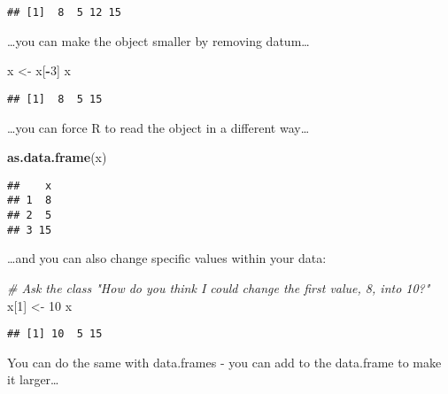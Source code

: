 \documentclass[]{article}
\newenvironment{Shaded}{\begin{snugshade}}{\end{snugshade}}
\newcommand{\KeywordTok}[1]{\textcolor[rgb]{0.13,0.29,0.53}{\textbf{#1}}}
\newcommand{\DecValTok}[1]{\textcolor[rgb]{0.00,0.00,0.81}{#1}}
\newcommand{\StringTok}[1]{\textcolor[rgb]{0.31,0.60,0.02}{#1}}
\newcommand{\CommentTok}[1]{\textcolor[rgb]{0.56,0.35,0.01}{\textit{#1}}}
\newcommand{\OperatorTok}[1]{\textcolor[rgb]{0.81,0.36,0.00}{\textbf{#1}}}
\newcommand{\NormalTok}[1]{#1}
\begin{document}
\begin{verbatim}
## [1]  8  5 12 15
\end{verbatim}

\ldots{}you can make the object smaller by removing datum\ldots{}

\begin{Shaded}
\begin{Highlighting}[]
\NormalTok{x <-}\StringTok{ }\NormalTok{x[}\OperatorTok{-}\DecValTok{3}\NormalTok{]}
\NormalTok{x}
\end{Highlighting}
\end{Shaded}

\begin{verbatim}
## [1]  8  5 15
\end{verbatim}

\ldots{}you can force R to read the object in a different way\ldots{}

\begin{Shaded}
\begin{Highlighting}[]
\KeywordTok{as.data.frame}\NormalTok{(x)}
\end{Highlighting}
\end{Shaded}

\begin{verbatim}
##    x
## 1  8
## 2  5
## 3 15
\end{verbatim}

\ldots{}and you can also change specific values within your data:

\begin{Shaded}
\begin{Highlighting}[]
\CommentTok{# Ask the class "How do you think I could change the first value, 8, into 10?"}
\NormalTok{x[}\DecValTok{1}\NormalTok{] <-}\StringTok{ }\DecValTok{10}
\NormalTok{x}
\end{Highlighting}
\end{Shaded}

\begin{verbatim}
## [1] 10  5 15
\end{verbatim}

You can do the same with data.frames - you can add to the data.frame to
make it larger\ldots{}

\begin{Shaded}
\end{Shaded}
\end{document}
